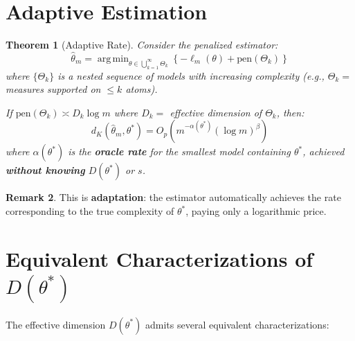 \documentclass[11pt]{article}
\newtheorem{theorem}{Theorem}[section]
\theoremstyle{definition}
\newtheorem{remark}[theorem]{Remark}
\DeclareMathOperator{\argmin}{arg\,min}
\begin{document}
\section{Adaptive Estimation}

\begin{theorem}[Adaptive Rate]
\label{thm:adaptive}
Consider the penalized estimator:
\begin{equation}
    \hat{\theta}_m = \argmin_{\theta \in \bigcup_{k=1}^\infty \Theta_k} \left\{-\ell_m(\theta) + \mathrm{pen}(\Theta_k)\right\}
\end{equation}
where $\{\Theta_k\}$ is a nested sequence of models with increasing complexity (e.g., $\Theta_k = $ measures supported on $\leq k$ atoms).

If $\mathrm{pen}(\Theta_k) \asymp D_k \log m$ where $D_k = $ effective dimension of $\Theta_k$, then:
\begin{equation}
    d_K(\hat{\theta}_m, \theta^*) = O_p\left(m^{-\alpha(\theta^*)} (\log m)^{\beta}\right)
\end{equation}
where $\alpha(\theta^*)$ is the \textbf{oracle rate} for the smallest model containing $\theta^*$, achieved \textbf{without knowing} $D(\theta^*)$ or $s$.
\end{theorem}

\begin{remark}
This is \textbf{adaptation}: the estimator automatically achieves the rate corresponding to the true complexity of $\theta^*$, paying only a logarithmic price.
\end{remark}

\section{Equivalent Characterizations of $D(\theta^*)$}

The effective dimension $D(\theta^*)$ admits several equivalent characterizations:
\end{document}
